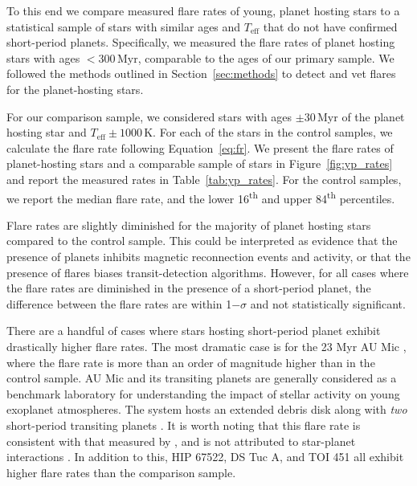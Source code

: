 \documentclass[twocolumn]{aastex631}
\begin{document}
To this end we compare  measured flare rates of young, planet hosting stars to a statistical sample of stars with similar ages and $T_\textrm{eff}$ that do not have confirmed short-period planets.
Specifically, we measured the flare rates of planet hosting stars with ages $< 300$\,Myr, comparable to the ages of our primary sample. We followed the methods outlined in Section~\ref{sec:methods}
to detect and vet flares for the planet-hosting stars.

For our comparison sample, we considered stars with ages $\pm 30$\,Myr of the planet hosting star and $T_\textrm{eff} \pm 1000$\,K. For each of the stars in the control samples, we calculate the
flare rate following Equation~\ref{eq:fr}. We present the flare rates of planet-hosting stars and a comparable sample of stars in Figure~\ref{fig:yp_rates} and report the measured rates in
Table~\ref{tab:yp_rates}. For the control samples, we report the median flare rate, and the lower 16\textsuperscript{th} and upper 84\textsuperscript{th} percentiles.

Flare rates are slightly diminished for the majority of planet hosting stars compared to the control sample. This could be interpreted as evidence that the presence of planets inhibits magnetic
reconnection events and activity, or that the presence of flares biases transit-detection algorithms. However, for all cases where the flare rates are diminished in the presence of a short-period
planet, the difference between the flare rates are within 1$-\sigma$ and not statistically significant.

There are a handful of cases where stars hosting short-period planet exhibit drastically higher flare rates. The most dramatic case is for the 23 Myr AU Mic \citep{jeffries05,malo14,Mamajek14},
where the flare rate is more than an order of magnitude higher than in the control sample.  AU Mic and its transiting planets are generally considered as a benchmark laboratory for understanding
the impact of stellar activity on young exoplanet atmospheres. The system hosts an  extended debris disk \citep{kalas04, liu04, metchev05} along with \textit{two} short-period transiting planets
\citep{plavchan20, martioli21, gilbert22}. It is worth noting that this flare rate is consistent with that measured by \citet{gilbert22, feinstein22_aumic}, and is not attributed to star-planet
interactions \citep{ilin22}. In addition to this, HIP 67522, DS Tuc A, and TOI 451 all exhibit higher flare rates than the comparison sample.
\end{document}
